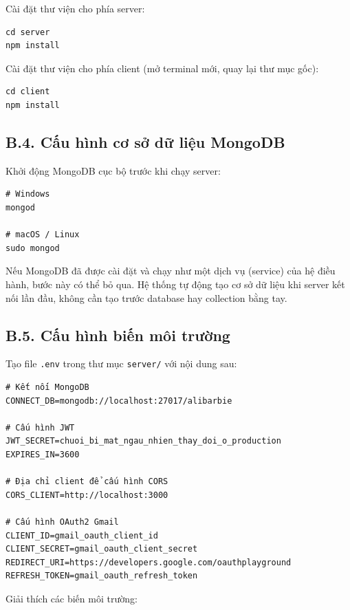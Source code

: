 \documentclass[../DoAn.tex]{subfiles}
\begin{document}
Cài đặt thư viện cho phía server:
\begin{verbatim}
cd server
npm install
\end{verbatim}

Cài đặt thư viện cho phía client (mở terminal mới, quay lại thư mục gốc):
\begin{verbatim}
cd client
npm install
\end{verbatim}

\subsection*{B.4. Cấu hình cơ sở dữ liệu MongoDB}

Khởi động MongoDB cục bộ trước khi chạy server:

\begin{verbatim}
# Windows
mongod

# macOS / Linux
sudo mongod
\end{verbatim}

Nếu MongoDB đã được cài đặt và chạy như một dịch vụ (service) của hệ điều
hành, bước này có thể bỏ qua. Hệ thống tự động tạo cơ sở dữ liệu khi server
kết nối lần đầu, không cần tạo trước database hay collection bằng tay.

\subsection*{B.5. Cấu hình biến môi trường}

Tạo file \texttt{.env} trong thư mục \texttt{server/} với nội dung sau:

\begin{verbatim}
# Kết nối MongoDB
CONNECT_DB=mongodb://localhost:27017/alibarbie

# Cấu hình JWT
JWT_SECRET=chuoi_bi_mat_ngau_nhien_thay_doi_o_production
EXPIRES_IN=3600

# Địa chỉ client để cấu hình CORS
CORS_CLIENT=http://localhost:3000

# Cấu hình OAuth2 Gmail
CLIENT_ID=gmail_oauth_client_id
CLIENT_SECRET=gmail_oauth_client_secret
REDIRECT_URI=https://developers.google.com/oauthplayground
REFRESH_TOKEN=gmail_oauth_refresh_token
\end{verbatim}

Giải thích các biến môi trường:
\end{document}
